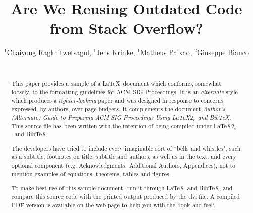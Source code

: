 \documentclass{sig-alternate-05-2015}
\begin{document}






%

\title{Are We Reusing Outdated Code from Stack Overflow?}

\author{
	\alignauthor
	$^1$Chaiyong Ragkhitwetsagul, $^1$Jens Krinke, $^1$Matheus Paixao, $^2$Giuseppe Bianco \\
	\\
}


\maketitle
\begin{abstract}
This paper provides a sample of a \LaTeX\ document which conforms,
somewhat loosely, to the formatting guidelines for
ACM SIG Proceedings. It is an {\em alternate} style which produces
a {\em tighter-looking} paper and was designed in response to
concerns expressed, by authors, over page-budgets.
It complements the document \textit{Author's (Alternate) Guide to
Preparing ACM SIG Proceedings Using \LaTeX$2_\epsilon$\ and Bib\TeX}.
This source file has been written with the intention of being
compiled under \LaTeX$2_\epsilon$\ and BibTeX.

The developers have tried to include every imaginable sort
of ``bells and whistles", such as a subtitle, footnotes on
title, subtitle and authors, as well as in the text, and
every optional component (e.g. Acknowledgments, Additional
Authors, Appendices), not to mention examples of
equations, theorems, tables and figures.

To make best use of this sample document, run it through \LaTeX\
and BibTeX, and compare this source code with the printed
output produced by the dvi file. A compiled PDF version
is available on the web page to help you with the
`look and feel'.
\end{abstract}
\end{document}
